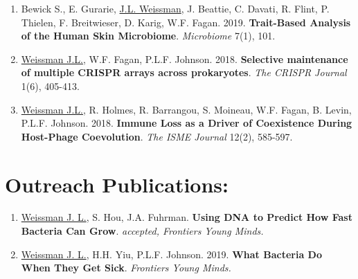 \documentclass[]{res}
\begin{document}
\begin{resume}
\begin{enumerate}[leftmargin=*]
 \item Bewick S., E. Gurarie, \underline{J.L. Weissman}, J. Beattie, C. Davati, R. Flint, P. Thielen, F. Breitwieser, D. Karig, W.F. Fagan. 2019. {\bf Trait-Based Analysis of the Human Skin Microbiome}. \emph{Microbiome} 7(1), 101.  %

 \item \underline{Weissman J.L.}, W.F. Fagan, P.L.F. Johnson. 2018. {\bf Selective maintenance of multiple CRISPR arrays across prokaryotes}. \emph{The CRISPR Journal} 1(6), 405-413. %
 
\item \underline{Weissman J.L.}, R. Holmes, R. Barrangou, S. Moineau, W.F. Fagan, B. Levin, P.L.F. Johnson. 2018. {\bf Immune Loss as a Driver of Coexistence During Host-Phage Coevolution}. \emph{The ISME Journal} 12(2), 585-597. %

\end{enumerate} 
 

 
\section{Outreach Publications:} \vspace{0mm}

 \begin{enumerate}[leftmargin=*]

\item \underline{Weissman J. L.}, S. Hou, J.A. Fuhrman. {\bf Using DNA to Predict How Fast Bacteria Can Grow}. \emph{accepted, Frontiers Young Minds.}

\item \underline{Weissman J. L.}, H.H. Yiu, P.L.F. Johnson. 2019. {\bf What Bacteria Do When They Get Sick}. \emph{Frontiers Young Minds.}


  \end{enumerate} 
  

\end{resume}
\end{document}
